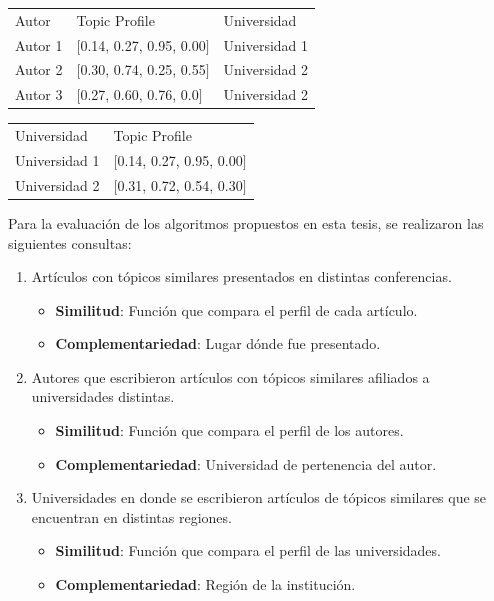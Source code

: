 \begin{table}[H]
\begin{tabular}{lll}
	Autor & Topic Profile & Universidad \\
	Autor 1 & $[$0.14, 0.27, 0.95, 0.00$]$ & Universidad 1 \\
	Autor 2 & $[$0.30, 0.74, 0.25, 0.55$]$ & Universidad 2 \\
	Autor 3 & $[$0.27, 0.60, 0.76, 0.0$]$ & Universidad 2 \\
\end{tabular}
\label{tabla:topicProfileEj2}
\end{table}

\begin{table}[H]
\begin{tabular}{ll}
	Universidad & Topic Profile \\
	Universidad 1 & $[$0.14, 0.27, 0.95, 0.00$]$ \\
	Universidad 2 & $[$0.31, 0.72, 0.54, 0.30$]$ \\
\end{tabular}
\label{tabla:topicProfileEj3}
\end{table}

Para la evaluación de los algoritmos propuestos en esta tesis, se realizaron las siguientes consultas:
\begin{enumerate}
	\item
		Artículos con tópicos similares presentados en distintas conferencias. \label{busqueda:articulos}
		\begin{itemize}
			\item \textbf{Similitud}: Función que compara el perfil de cada artículo.
			\item \textbf{Complementariedad}: Lugar dónde fue presentado.
		\end{itemize}

	\item
	Autores que escribieron artículos con tópicos similares afiliados a universidades distintas. \label{busqueda:autores}
	\begin{itemize}
		\item \textbf{Similitud}: Función que compara el perfil de los autores.
		\item \textbf{Complementariedad}: Universidad de pertenencia del autor.
	\end{itemize}

	\item 
	Universidades en donde se escribieron artículos de tópicos similares que se encuentran en distintas regiones. \label{busqueda:universidades}
	\begin{itemize}
		\item \textbf{Similitud}: Función que compara el perfil de las universidades.
		\item \textbf{Complementariedad}: Región de la institución.
	\end{itemize}
\end {enumerate}

